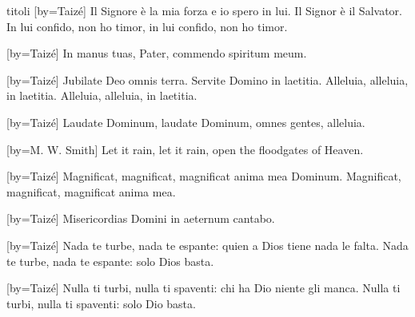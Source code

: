 \begin{songs}{titoli}
[by={Taizé}]
\beginverse*
Il Signore è la mia forza
e io spero in lui.
Il Signor è il Salvator.
In lui confido, non ho timor,
in lui confido, non ho timor.
\endverse
\endsong

[by={Taizé}]
\beginverse*
In manus tuas, Pater,
commendo spiritum meum.
\endverse
\endsong

[by={Taizé}]
\beginverse*
Jubilate Deo omnis terra.
Servite Domino in laetitia.
Alleluia, alleluia, in laetitia.
Alleluia, alleluia, in laetitia.
\endverse
\endsong

[by={Taizé}]
\beginverse*
Laudate Dominum, laudate Dominum,
omnes gentes, alleluia.
\endverse
\endsong

[by={M. W. Smith}]
\beginverse*
Let it rain, let it rain,
open the floodgates of Heaven.
\endverse
\endsong

[by={Taizé}]
\beginverse*
Magnificat, magnificat,
magnificat anima mea Dominum.
Magnificat, magnificat,
magnificat anima mea.
\endverse
\endsong

[by={Taizé}]
\beginverse*
Misericordias Domini
in aeternum cantabo.
\endverse
\endsong

[by={Taizé}]
\beginverse*
Nada te turbe, nada te espante:
quien a Dios tiene nada le falta.
Nada te turbe, nada te espante:
solo Dios basta.
\endverse
\endsong

[by={Taizé}]
\beginverse*
Nulla ti turbi, nulla ti spaventi:
chi ha Dio niente gli manca.
Nulla ti turbi, nulla ti spaventi:
solo Dio basta.
\endverse
\endsong


\end{songs}
